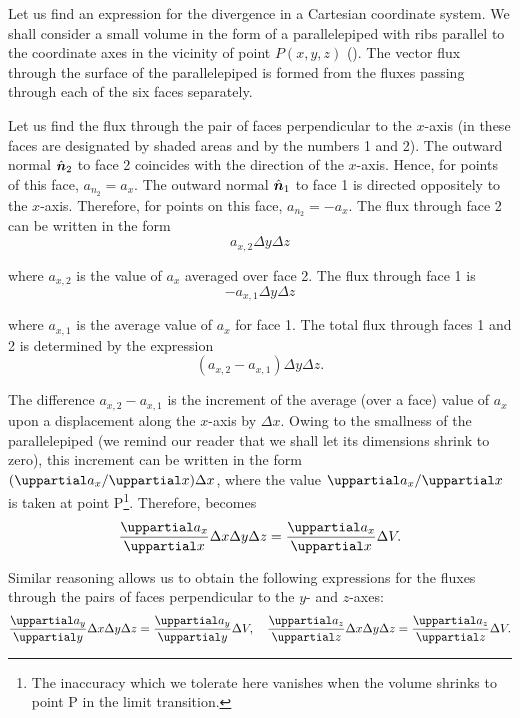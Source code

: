 Let us find an expression for the divergence in a Cartesian coordinate system. We shall consider a small volume in the form of a parallelepiped with ribs parallel to the coordinate axes in the vicinity of point $P(x, y, z)$ (). The vector flux through the surface of the parallelepiped is formed from the fluxes passing through each of the six faces separately.

Let us find the flux through the pair of faces perpendicular to the $x$-axis (in  these faces are designated by shaded areas and by the numbers 1 and 2). The outward normal $\hat{\boldsymbol{n}}_2$ to face 2 coincides with the direction of the $x$-axis. Hence, for points of this face, $a_{n_2}=a_x$. The outward normal $\hat{\boldsymbol{n}}_1$ to face 1 is directed oppositely to the $x$-axis. Therefore, for points on this face, $a_{n_2}=-a_x$. The flux through face 2 can be written in the form
\begin{equation*}
	a_{x,2}\Delta{y}\Delta{z}
\end{equation*}

\noindent
where $a_{x,2}$ is the value of $a_x$ averaged over face 2. The flux through face 1 is
\begin{equation*}
	- a_{x,1}\Delta{y}\Delta{z}
\end{equation*}

\noindent
where $a_{x,1}$ is the average value of $a_x$ for face 1. The total flux through faces 1 and 2 is determined by the expression
\begin{equation}\label{eq:1_80}
	(a_{x,2} - a_{x,1}) \Delta{y}\Delta{z}.
\end{equation}

The difference $a_{x,2}-a_{x,1}$ is the increment of the average (over a face) value of $a_x$ upon a displacement along the $x$-axis by $\Delta{x}$. Owing to the smallness of the parallelepiped (we remind our reader that we shall let its dimensions shrink to zero), this increment can be written in the form $(\diffinpartial{a_x}{x})\Delta{x}$, where the value $\diffinpartial{a_x}{x}$ is taken at point P\footnote{The inaccuracy which we tolerate here vanishes when the volume shrinks to point P in the limit transition.}. Therefore,  becomes
\begin{equation*}
	\diffpartial{a_x}{x}\Delta{x}\Delta{y}\Delta{z} = \diffpartial{a_x}{x}\Delta{V}.
\end{equation*}

\noindent
Similar reasoning allows us to obtain the following expressions for the fluxes through the pairs of faces perpendicular to the $y$- and $z$-axes:
\begin{equation*}
	\diffpartial{a_y}{y}\Delta{x}\Delta{y}\Delta{z} = \diffpartial{a_y}{y}\Delta{V},\quad \diffpartial{a_z}{z}\Delta{x}\Delta{y}\Delta{z} = \diffpartial{a_z}{z}\Delta{V}.
\end{equation*}

